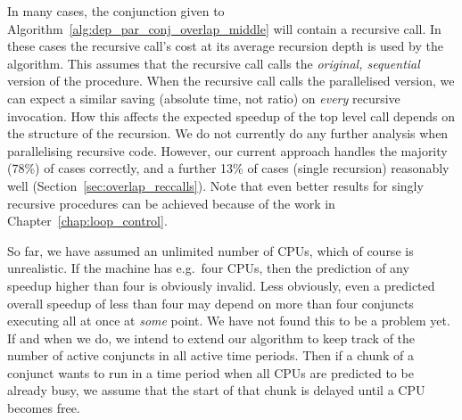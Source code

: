 In many cases,
the conjunction given to Algorithm~\ref{alg:dep_par_conj_overlap_middle}
will contain a recursive call.
In these cases the recursive call's cost at its average recursion depth is
used by the algorithm.
This assumes that the recursive call
calls the \emph{original, sequential} version of the procedure.
When the recursive call calls the parallelised version,
we can expect a similar saving (absolute time, not ratio)
on \emph{every} recursive invocation.
How this affects the expected speedup of the top level call
depends on the structure of the recursion.
We do not currently do any further analysis when parallelising recursive
code.
However, our current approach handles the majority (78\%) of cases correctly,
and a further 13\% of cases (single recursion) reasonably well
(Section~\ref{sec:overlap_reccalls}).
Note that even better results for singly recursive procedures can be
achieved because of the work in Chapter~\ref{chap:loop_control}.

So far, we have assumed an unlimited number of CPUs,
which of course is unrealistic.
If the machine has e.g.\ four CPUs,
then the prediction of any speedup higher than four is obviously invalid.
Less obviously,
even a predicted overall speedup of less than four may depend
on more than four conjuncts executing all at once at \emph{some} point.
We have not found this to be a problem yet.
If and when we do,
we intend to extend our algorithm to keep track
of the number of active conjuncts in all active time periods.
Then if a chunk of a conjunct wants to run in a time period
when all CPUs are predicted to be already busy,
we assume that the start of that chunk is delayed until a CPU becomes free.

